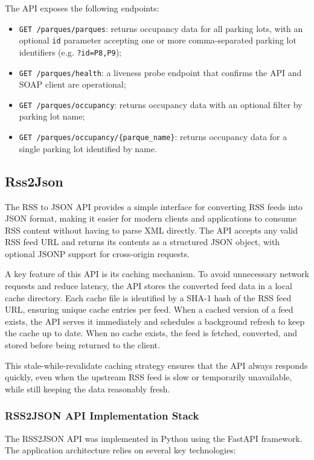 \documentclass[12pt, a4paper]{report}
\begin{document}
The API exposes the following endpoints:

\begin{itemize}
    \item \texttt{GET /parques/parques}: returns occupancy data for all parking lots,
          with an optional \texttt{id} parameter accepting one or more comma-separated
          parking lot identifiers (e.g. \texttt{?id=P8,P9});
    \item \texttt{GET /parques/health}: a liveness probe endpoint that confirms the API
          and SOAP client are operational;
    \item \texttt{GET /parques/occupancy}: returns occupancy data with an optional filter
          by parking lot name;
    \item \texttt{GET /parques/occupancy/\{parque\_name\}}: returns occupancy data for a
          single parking lot identified by name.
\end{itemize}

\subsection{Rss2Json}
The RSS to JSON API provides a simple interface for converting RSS feeds into JSON format,
making it easier for modern clients and applications to consume RSS content without having
to parse XML directly. The API accepts any valid RSS feed URL and returns its contents
as a structured JSON object, with optional JSONP support for cross-origin requests.

A key feature of this API is its caching mechanism. To avoid unnecessary network requests
and reduce latency, the API stores the converted feed data in a local cache directory.
Each cache file is identified by a SHA-1 hash of the RSS feed URL, ensuring unique cache
entries per feed. When a cached version of a feed exists, the API serves it immediately
and schedules a background refresh to keep the cache up to date. When no cache exists,
the feed is fetched, converted, and stored before being returned to the client.

This stale-while-revalidate caching strategy ensures that the API always responds quickly,
even when the upstream RSS feed is slow or temporarily unavailable, while still keeping
the data reasonably fresh.

\subsubsection{RSS2JSON API Implementation Stack}
The RSS2JSON API was implemented in Python using the FastAPI framework. The application
architecture relies on several key technologies:
\end{document}
